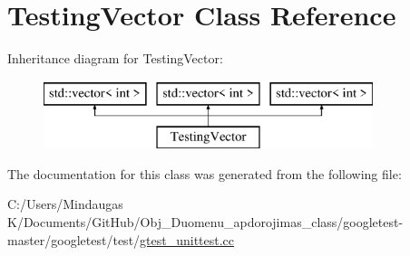 \hypertarget{class_testing_vector}{}\section{Testing\+Vector Class Reference}
\label{class_testing_vector}
Inheritance diagram for Testing\+Vector\+:\begin{figure}[H]
\begin{center}
\leavevmode
\includegraphics[height=2.000000cm]{d3/d6a/class_testing_vector}
\end{center}
\end{figure}


The documentation for this class was generated from the following file\+:\begin{DoxyCompactItemize}
\item 
C\+:/\+Users/\+Mindaugas K/\+Documents/\+Git\+Hub/\+Obj\+\_\+\+Duomenu\+\_\+apdorojimas\+\_\+class/googletest-\/master/googletest/test/\mbox{\hyperlink{googletest-master_2googletest_2test_2gtest__unittest_8cc}{gtest\+\_\+unittest.\+cc}}\end{DoxyCompactItemize}
